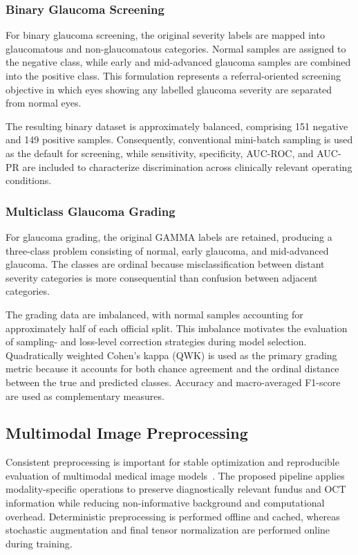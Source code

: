 \documentclass[preprint,12pt]{elsarticle}
\begin{document}
\subsubsection{Binary Glaucoma Screening}
\label{subsubsec:binary_screening}

For binary glaucoma screening, the original severity labels are mapped into glaucomatous and non-glaucomatous categories. Normal samples are assigned to the negative class, while early and mid-advanced glaucoma samples are combined into the positive class. This formulation represents a referral-oriented screening objective in which eyes showing any labelled glaucoma severity are separated from normal eyes.

The resulting binary dataset is approximately balanced, comprising 151 negative and 149 positive samples. Consequently, conventional mini-batch sampling is used as the default for screening, while sensitivity, specificity, AUC-ROC, and AUC-PR are included to characterize discrimination across clinically relevant operating conditions.

\subsubsection{Multiclass Glaucoma Grading}
\label{subsubsec:multiclass_grading}

For glaucoma grading, the original GAMMA labels are retained, producing a three-class problem consisting of normal, early glaucoma, and mid-advanced glaucoma. The classes are ordinal because misclassification between distant severity categories is more consequential than confusion between adjacent categories.

The grading data are imbalanced, with normal samples accounting for approximately half of each official split. This imbalance motivates the evaluation of sampling- and loss-level correction strategies during model selection. Quadratically weighted Cohen's kappa (QWK) is used as the primary grading metric because it accounts for both chance agreement and the ordinal distance between the true and predicted classes. Accuracy and macro-averaged F1-score are used as complementary measures.

\subsection{Multimodal Image Preprocessing}
\label{subsec:preprocessing}

Consistent preprocessing is important for stable optimization and reproducible evaluation of multimodal medical image models~\cite{virbukaite2023impact,sun2025hybrid}. The proposed pipeline applies modality-specific operations to preserve diagnostically relevant fundus and OCT information while reducing non-informative background and computational overhead. Deterministic preprocessing is performed offline and cached, whereas stochastic augmentation and final tensor normalization are performed online during training.
\end{document}

